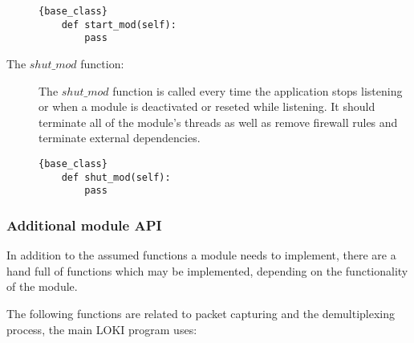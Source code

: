 \documentclass[a4paper, 11pt]{article}
\begin{document}
\begin{description}
                \begin{lstlisting}[caption=Initialization and reset]{base_class}
    def start_mod(self):
        pass
                \end{lstlisting}
                \item[The $shut\_mod$ function:] The $shut\_mod$ function is called every time the application stops listening or when a module is deactivated or reseted while listening. It should terminate all of the module's threads as well as remove firewall rules and terminate external dependencies.

                \begin{lstlisting}[caption=Shutdown]{base_class}
    def shut_mod(self):
        pass
                \end{lstlisting}
            \end{description}

            \subsubsection{Additional module API}
            \label{module-api-add}

                In addition to the assumed functions a module needs to implement, there are a hand full of functions which may be implemented, depending on the functionality of the module.

                The following functions are related to packet capturing and the demultiplexing process, the main LOKI program uses:
                
\end{document}
